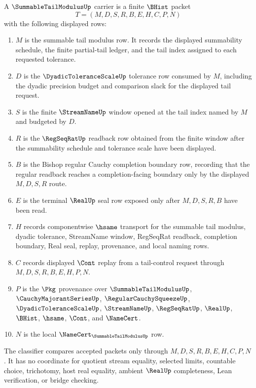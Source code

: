 \begin{definition}
\label{def:summable-tail-modulus-carrier}
A $\SummableTailModulusUp$ carrier is a finite $\BHist$ packet
$$
T=(M,D,S,R,B,E,H,C,P,N)
$$
with the following displayed rows:
\begin{enumerate}
\item $M$ is the summable tail modulus row. It records the displayed summability schedule, the finite partial-tail ledger, and the tail index assigned to each requested tolerance.
\item $D$ is the $\DyadicToleranceScaleUp$ tolerance row consumed by $M$, including the dyadic precision budget and comparison slack for the displayed tail request.
\item $S$ is the finite $\StreamNameUp$ window opened at the tail index named by $M$ and budgeted by $D$.
\item $R$ is the $\RegSeqRatUp$ readback row obtained from the finite window after the summability schedule and tolerance scale have been displayed.
\item $B$ is the Bishop regular Cauchy completion boundary row, recording that the regular readback reaches a completion-facing boundary only by the displayed $M,D,S,R$ route.
\item $E$ is the terminal $\RealUp$ seal row exposed only after $M,D,S,R,B$ have been read.
\item $H$ records componentwise $\hsame$ transport for the summable tail modulus, dyadic tolerance, StreamName window, RegSeqRat readback, completion boundary, Real seal, replay, provenance, and local naming rows.
\item $C$ records displayed $\Cont$ replay from a tail-control request through $M,D,S,R,B,E,H,P,N$.
\item $P$ is the $\Pkg$ provenance over $\SummableTailModulusUp$, $\CauchyMajorantSeriesUp$, $\RegularCauchySqueezeUp$, $\DyadicToleranceScaleUp$, $\StreamNameUp$, $\RegSeqRatUp$, $\RealUp$, $\BHist$, $\hsame$, $\Cont$, and $\NameCert$.
\item $N$ is the local $\NameCert_{\SummableTailModulusUp}$ row.
\end{enumerate}
The classifier compares accepted packets only through $M,D,S,R,B,E,H,C,P,N$. It has no coordinate for quotient stream equality, selected limits, countable choice, trichotomy, host real equality, ambient $\RealUp$ completeness, Lean verification, or bridge checking.
\end{definition}

